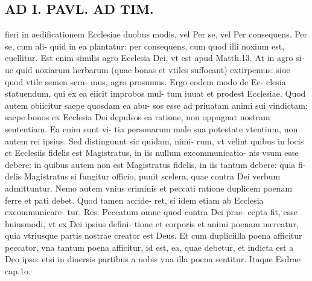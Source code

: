 \documentclass{article}
\begin{document}
\begin{pages}
\section*{AD I. PAVL. AD TIM. }
\marginpar{[ p.30 ]}\pstart fieri in aedificationem Ecclesiae duobus modis, vel Per se, vel Per consequens. Per se, cum ali- quid in ea plantatur: per consequens, cum quod illi noxium est, euellitur. Est enim similis agro Ecclesia Dei, vt est apud Matth.13. At in agro si- ue quid noxiarum herbarum (quae bonas et vtiles suffocant) extirpemus: siue quod vtile semen sera- mus, agro prosumus. Ergo eodem modo de Ec- clesia statuendum, qui ex ea eiicit improbos mul- tum iuuat et prodest Ecclesiae. Quod autem obiicitur saepe quosdam ea abu- sos esse ad priuatam animi sui vindictam: saepe bonos ex Ecclesia Dei depulsos ea ratione, non oppugnat nostram sententiam. Ea enim sunt vi- tia persouarum male sua potestate vtentium, non autem rei ipsius. Sed distinguunt sic quidam, nimi- rum, vt velint quibus in locis et Ecclesiis fidelis est Magistratus, in iis nullum excommunicatio- nis vsum esse debere: in quibus autem non est Magistratus fidelis, in iis tantum debere: quia fi- delis Magistratus si fungitur officio, punit scelera, quae contra Dei verbum admittuntur. Nemo autem vnius criminis et peccati ratione duplicem poenam ferre et pati debet. Quod tamen accide- ret, si idem etiam ab Ecclesia excommunicare- tur. Res. Peccatum omne quod contra Dei prae- cepta fit, esse huiusmodi, vt ex Dei ipsius defini- tione et corporis et animi poenam mereatur, quia vtriusque partis nostrae creator est Deus. Et cum dupliciilla poena afficitur peccator, vna tantum poena afficitur, id est, ea, quae debetur, et indicta est a Deo ipso: etsi in diuersis partibus a nobis vna illa poena sentitur. Itaque Esdrae cap.1o.  \pend

\end{pages}
\end{document}
